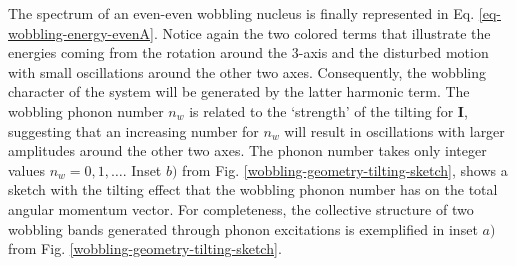 The spectrum of an even-even wobbling nucleus is finally represented in Eq. \ref{eq-wobbling-energy-evenA}. Notice again the two colored terms that illustrate the energies coming from the rotation around the $3$-axis and the disturbed motion with small oscillations around the other two axes. Consequently, the wobbling character of the system will be generated by the latter harmonic term. The wobbling phonon number $n_w$ is related to the `strength' of the tilting for $\mathbf{I}$, suggesting that an increasing number for $n_w$ will result in oscillations with larger amplitudes around the other two axes. The phonon number takes only integer values $n_w=0,1,\dots$. Inset $b)$ from Fig. \ref{wobbling-geometry-tilting-sketch}, shows a sketch with the tilting effect that the wobbling phonon number has on the total angular momentum vector. For completeness, the collective structure of two wobbling bands generated through phonon excitations is exemplified in inset $a)$ from Fig. \ref{wobbling-geometry-tilting-sketch}.
